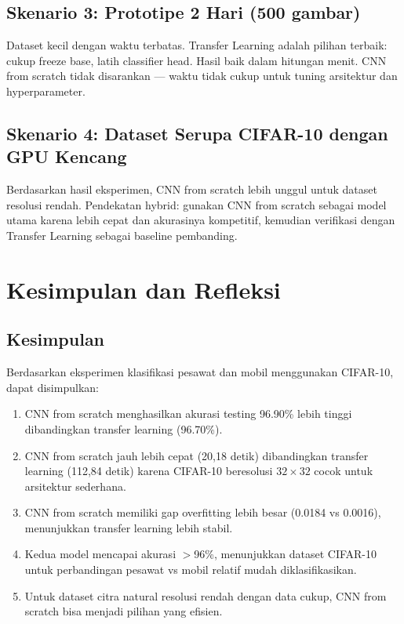 \documentclass[conference]{IEEEtran}
\begin{document}
\subsection{Skenario 3: Prototipe 2 Hari (500 gambar)}
Dataset kecil dengan waktu terbatas. Transfer Learning adalah pilihan terbaik: cukup freeze base, latih classifier head. Hasil baik dalam hitungan menit. CNN from scratch tidak disarankan — waktu tidak cukup untuk tuning arsitektur dan hyperparameter.

\subsection{Skenario 4: Dataset Serupa CIFAR-10 dengan GPU Kencang}
Berdasarkan hasil eksperimen, CNN from scratch lebih unggul untuk dataset resolusi rendah. Pendekatan hybrid: gunakan CNN from scratch sebagai model utama karena lebih cepat dan akurasinya kompetitif, kemudian verifikasi dengan Transfer Learning sebagai baseline pembanding.

\section{Kesimpulan dan Refleksi}
\subsection{Kesimpulan}
Berdasarkan eksperimen klasifikasi pesawat dan mobil menggunakan CIFAR-10, dapat disimpulkan:
\begin{enumerate}
\item CNN from scratch menghasilkan akurasi testing 96.90\% lebih tinggi dibandingkan transfer learning (96.70\%).
\item CNN from scratch jauh lebih cepat (20,18 detik) dibandingkan transfer learning (112,84 detik) karena CIFAR-10 beresolusi $32\times32$ cocok untuk arsitektur sederhana.
\item CNN from scratch memiliki gap overfitting lebih besar (0.0184 vs 0.0016), menunjukkan transfer learning lebih stabil.
\item Kedua model mencapai akurasi $>$96\%, menunjukkan dataset CIFAR-10 untuk perbandingan pesawat vs mobil relatif mudah diklasifikasikan.
\item Untuk dataset citra natural resolusi rendah dengan data cukup, CNN from scratch bisa menjadi pilihan yang efisien.
\end{enumerate}
\end{document}
